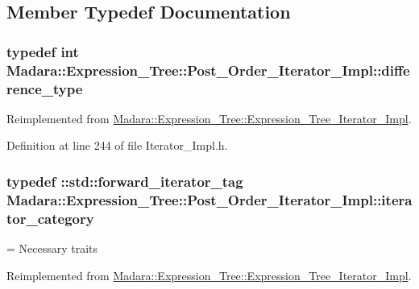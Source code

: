 \subsection{Member Typedef Documentation}
\hypertarget{classMadara_1_1Expression__Tree_1_1Post__Order__Iterator__Impl_a126fb29e61a2f9753ca68acb648372e6}{
\subsubsection[{difference\_\-type}]{\setlength{\rightskip}{0pt plus 5cm}typedef int {\bf Madara::Expression\_\-Tree::Post\_\-Order\_\-Iterator\_\-Impl::difference\_\-type}}}
\label{d4/d3e/classMadara_1_1Expression__Tree_1_1Post__Order__Iterator__Impl_a126fb29e61a2f9753ca68acb648372e6}


Reimplemented from \hyperlink{classMadara_1_1Expression__Tree_1_1Expression__Tree__Iterator__Impl_ae0238cb942a1398b7cd91dffe4c5ba3c}{Madara::Expression\_\-Tree::Expression\_\-Tree\_\-Iterator\_\-Impl}.



Definition at line 244 of file Iterator\_\-Impl.h.

\hypertarget{classMadara_1_1Expression__Tree_1_1Post__Order__Iterator__Impl_a7705e7513403a9230549f22307fc48a1}{
\subsubsection[{iterator\_\-category}]{\setlength{\rightskip}{0pt plus 5cm}typedef ::std::forward\_\-iterator\_\-tag {\bf Madara::Expression\_\-Tree::Post\_\-Order\_\-Iterator\_\-Impl::iterator\_\-category}}}
\label{d4/d3e/classMadara_1_1Expression__Tree_1_1Post__Order__Iterator__Impl_a7705e7513403a9230549f22307fc48a1}


= Necessary traits 



Reimplemented from \hyperlink{classMadara_1_1Expression__Tree_1_1Expression__Tree__Iterator__Impl_a59d9cb2efd705e21684d901de09399c7}{Madara::Expression\_\-Tree::Expression\_\-Tree\_\-Iterator\_\-Impl}.



